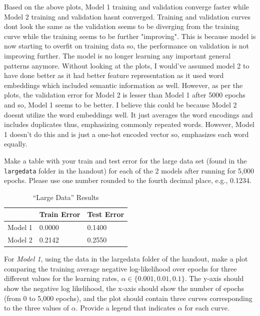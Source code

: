 \documentclass[11pt,addpoints,answers]{exam}
\begin{document}
\begin{questions}
\begin{your_solution}[height=8.5cm]
Based on the above plots, Model 1 training and validation converge faster while Model 2 training and validation hasnt converged. Training and validation curves dont look the same as the validation seems to be diverging from the training curve while the training seems to be further "improving". This is because model is now starting to overfit on training data so, the performance on validation is not improving further. The model is no longer learning any important general patterns anymore.\newline
Without looking at the plots, I would've assumed model 2 to have done better as it had better feature representation as it used word embeddings which included semantic information as well. However, as per the plots, the validation error for Model 2 is lesser than Model 1 after 5000 epochs and so, Model 1 seems to be better. I believe this could be because Model 2 doesnt utilize the word embeddings well. It just averages the word encodings and includes duplicates thus, emphasizing commonly repeated words. However, Model 1 doesn't do this and is just a one-hot encoded vector so, emphasizes each word equally.
\end{your_solution}

\question[2]
Make a table with your train and test error for the large data set (found in the \texttt{largedata} folder in the handout) for each of the 2 models after running for 5,000 epochs. Please use one number rounded to the  fourth decimal place, e.g., 0.1234.

\begin{your_solution}[height=6cm]
 \begin{table}[H]
    \centering
    \begin{tabular}{l|l|l}
    \toprule
    & Train Error & Test Error \\ 
    \midrule
    Model 1 & 0.0000 & 0.1400 \\ 
    Model 2 & 0.2142 & 0.2550 \\ 
    \bottomrule
    \end{tabular}
    \caption{``Large Data'' Results}
    \label{results}
\end{table}
\end{your_solution}




\newpage
\question[2]
For \emph{Model 1}, using the data in the largedata folder of the handout, make a plot comparing the training average negative log-likelihood over epochs for three different values for the learning rates, $\alpha \in \{0.001, 0.01, 0.1 \}$. The y-axis should show the negative log likelihood, the x-axis should show the number of epochs (from 0 to 5,000 epochs), and the plot should contain three curves corresponding to the three values of $\alpha$. Provide a legend that indicates $\alpha$ for each curve.
        

\end{questions}
\end{document}
